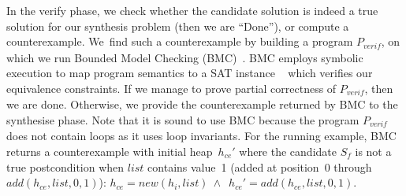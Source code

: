 \documentclass[runningheads,a4paper]{llncs}
\begin{document}
In the {\sc verify} phase, we check whether the candidate solution is indeed a 
true solution for our synthesis problem (then we are ``{\sc Done}''), 
or compute a counterexample.
%
We~find such a counterexample by building a program $P_\mathit{verif}$, on
which we run Bounded Model Checking
(BMC)~\cite{DBLP:journals/ac/BiereCCSZ03}.  
BMC employs symbolic execution to map program semantics to a SAT instance
~\cite{cbmc} which verifies our equivalence constraints.
If we manage to prove partial
correctness of $P_\mathit{verif}$, then we are done.  Otherwise, we provide
the counterexample returned by BMC to the {\sc synthesise} phase.  Note that
it is sound to use BMC because the program $P_\mathit{verif}$ does not
contain loops as it uses loop invariants.  For the running example, BMC
returns a counterexample with initial heap~$h_{ce}'$ where the candidate
$S_f$ is not a true postcondition when $\mathit{list}$ contains
value~1 (added at position~0 through
%
$\mathit{add}(h_{ce}, \mathit{list}, 0, 1)$):
$h_{ce} = \mathit{new}(h_i, \mathit{list}) ~\wedge \enspace h_{ce}' = \mathit{add}(h_{ce}, list, 0, 1)$.
\end{document}
